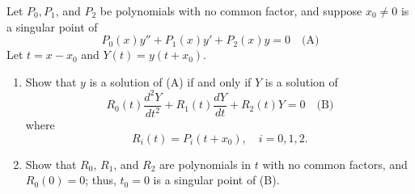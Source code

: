 \documentclass{ximera}
\begin{document}
\begin{problem}\label{exer:7.4.23}
Let  $P_0,P_1$, and $P_2$ be polynomials  with no common factor,  and
suppose   $x_0\neq 0$ is a singular point of
$$
P_0(x)y''+P_1(x)y'+P_2(x)y=0\quad
\text{(A)}
$$
Let $t=x-x_0$ and $Y(t)=y(t+x_0)$.
\begin{enumerate}
\item %
Show that $y$ is a solution of (A) if and only if $Y$
is a solution of
$$
R_0(t)\frac{d^2Y}{ dt^2}+R_1(t)\frac{dY}{ dt}+R_2(t)Y=0\quad
\text{(B)}
$$
where
$$
R_i(t)=P_i(t+x_0),\quad i=0,1,2.
$$
\item %
Show that $R_0$, $R_1$, and $R_2$ are polynomials in $t$ with no common
factors, and $R_0(0)=0$; thus,  $t_0=0$ is a singular
point of (B).
\end{enumerate}
\end{problem}
\end{document}
